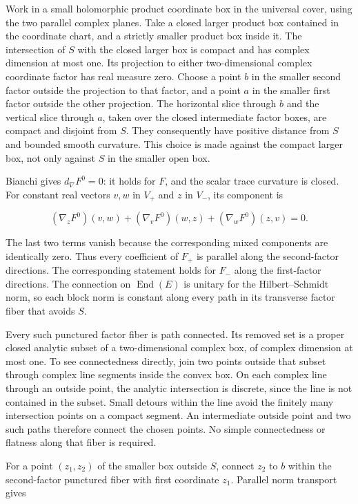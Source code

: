Work in a small holomorphic product coordinate box in the universal
cover, using the two parallel complex planes. Take a closed larger
product box contained in the coordinate chart, and a strictly smaller
product box inside it. The intersection of \(S\) with the closed larger box
is compact and has complex dimension at most one. Its projection to
either two-dimensional complex coordinate factor has real measure zero.
Choose a point \(b\) in the smaller second factor outside the projection to
that factor, and a point \(a\) in the smaller first factor outside the other
projection. The horizontal slice through \(b\) and the vertical slice
through \(a\), taken over the closed intermediate factor boxes, are compact
and disjoint from \(S\). They consequently have positive distance from \(S\) and
bounded smooth curvature. This choice is made against the compact larger
box, not only against \(S\) in the smaller open box.

Bianchi gives \(d_\nabla F^0=0\): it holds for \(F\), and the scalar trace
curvature is closed. For constant real vectors \(v,w\) in \(V_+\) and \(z\) in
\(V_-\), its component is

\[
 (\nabla_zF^0)(v,w)+(\nabla_vF^0)(w,z)
                      +(\nabla_wF^0)(z,v)=0.
 \tag{E834.11}
\]

The last two terms vanish because the corresponding mixed components are
identically zero. Thus every coefficient of \(F_+\) is parallel along the
second-factor directions. The corresponding statement holds for \(F_-\)
along the first-factor directions. The connection on \(\operatorname{End}(E)\) is unitary
for the Hilbert--Schmidt norm, so each block norm is constant along
every path in its transverse factor fiber that avoids \(S\).

Every such punctured factor fiber is path connected. Its removed set is
a proper closed analytic subset of a two-dimensional complex box, of
complex dimension at most one. To see connectedness directly, join two
points outside that subset through complex line segments inside the
convex box. On each complex line through an outside point, the analytic
intersection is discrete, since the line is not contained in the subset.
Small detours within the line avoid the finitely many intersection
points on a compact segment. An intermediate outside point and two such
paths therefore connect the chosen points. No simple connectedness or
flatness along that fiber is required.

For a point \((z_1,z_2)\) of the smaller box outside \(S\), connect \(z_2\) to \(b\) within
the second-factor punctured fiber with first coordinate \(z_1\). Parallel
norm transport gives

